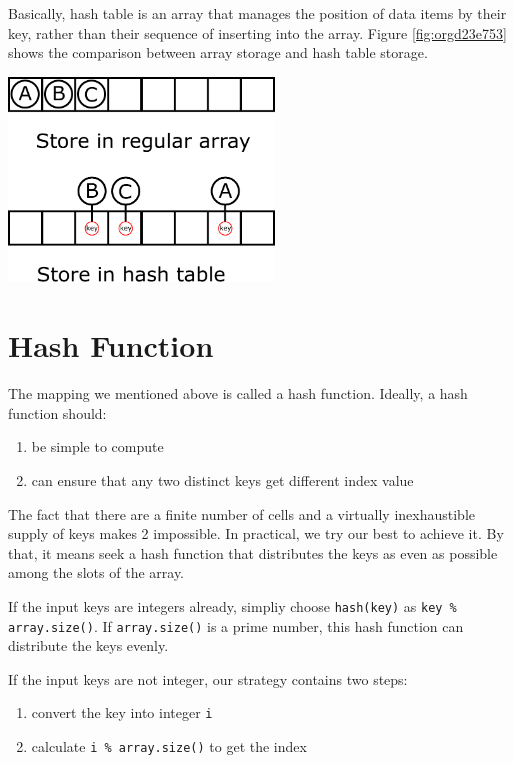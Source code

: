 \documentclass[11pt]{book}
\begin{document}
Basically, hash table is an array that manages the position of data items by their key, rather than their sequence of inserting into the array. Figure \ref{fig:orgd23e753} shows the comparison between array storage and hash table storage.

\begin{center}
\includegraphics[width=200pt]{./img/Hash-hashtable-illustration.pdf}
\end{center}


\section{Hash Function}
\label{sec:org244f4d6}

The mapping we mentioned above is called a hash function. Ideally, a hash function should:
\begin{enumerate}
\item be simple to compute
\item can ensure that any two distinct keys get different index value
\end{enumerate}

The fact that there are a finite number of cells and a virtually inexhaustible supply of keys makes 2 impossible. In practical, we try our best to achieve it. By that, it means seek a hash function that distributes the keys as even as possible among the slots of the array.

If the input keys are integers already, simpliy choose \texttt{hash(key)} as \texttt{key \% array.size()}. If \texttt{array.size()} is a prime number, this hash function can distribute the keys evenly.

If the input keys are not integer, our strategy contains two steps:
\begin{enumerate}
\item convert the key into integer \texttt{i}
\item calculate \texttt{i \% array.size()} to get the index
\end{enumerate}
\end{document}
